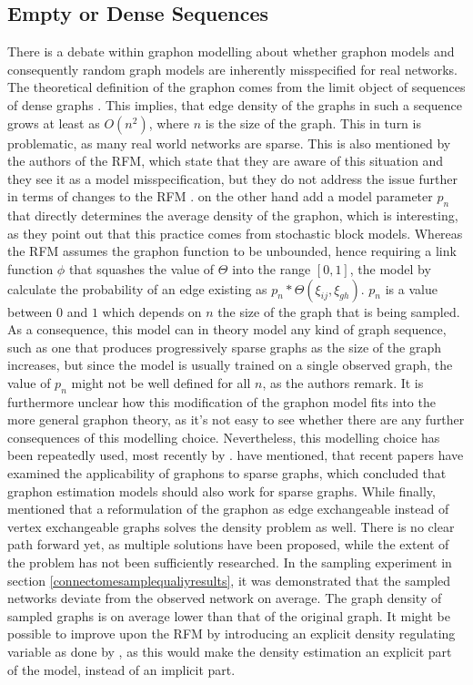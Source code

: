 \documentclass[11pt]{report} %
\begin{document}
\subsection{Empty or Dense Sequences}
There is a debate within graphon modelling about whether graphon models and consequently random graph models are inherently misspecified for real networks. The theoretical definition of the graphon comes from the limit object of sequences of dense graphs \cite{lovasz2006}. This implies, that edge density of the graphs in such a sequence grows at least as $O(n^2)$, where $n$ is the size of the graph. This in turn is problematic, as many real world networks are sparse. This is also mentioned by the authors of the RFM, which state that they are aware of this situation and they see it as a model misspecification, but they do not address the issue further in terms of changes to the RFM \cite{lloyd2012}.  on the other hand add a model parameter $p_n$ that directly determines the average density of the graphon, which is interesting, as they point out that this practice comes from stochastic block models.
Whereas the RFM assumes the graphon function to be unbounded, hence requiring a link function $\phi$ that squashes the value of $\Theta$ into the range $[0,1]$, the model by  calculate the probability of an edge existing as $p_n*\Theta(\xi_{ij},\xi_{gh})$. $p_n$ is a value between $0$ and $1$ which depends on $n$ the size of the graph that is being sampled. As a consequence, this model can in theory model any kind of graph sequence, such as one that produces progressively sparse graphs as the size of the graph increases, but since the model is usually trained on a single observed graph, the value of $p_n$ might not be well defined for all $n$, as the authors remark.
It is furthermore unclear how this modification of the graphon model fits into the more general graphon theory, as it's not easy to see whether there are any further consequences of this modelling choice.
Nevertheless, this modelling choice has been repeatedly used, most recently by .
 have mentioned, that recent papers have examined the applicability of graphons to sparse graphs, which concluded that graphon estimation models should also work for sparse graphs. While finally,  mentioned that a reformulation of the graphon as edge exchangeable instead of vertex exchangeable graphs solves the density problem as well. There is no clear path forward yet, as multiple solutions have been proposed, while the extent of the problem has not been sufficiently researched. In the sampling experiment in section \ref{connectomesamplequaliyresults}, it was demonstrated that the sampled networks deviate from the observed network on average. The graph density of sampled graphs is on average lower than that of the original graph. It might be possible to improve upon the RFM by introducing an explicit density regulating variable as done by , as this would make the density estimation an explicit part of the model, instead of an implicit part.
\end{document}
